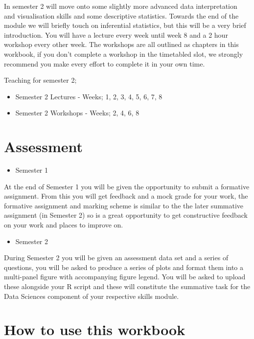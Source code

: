 \documentclass[
]{book}
\providecommand{\tightlist}{%
  \setlength{\itemsep}{0pt}\setlength{\parskip}{0pt}}
\begin{document}
In semester 2 will move onto some slightly more advanced data interpretation and visualisation skills and some descriptive statistics. Towards the end of the module we will briefly touch on inferential statistics, but this will be a very brief introduction. You will have a lecture every week until week 8 and a 2 hour workshop every other week. The workshops are all outlined as chapters in this workbook, if you don't complete a workshop in the timetabled slot, we strongly recommend you make every effort to complete it in your own time.

Teaching for semester 2;

\begin{itemize}
\tightlist
\item
  Semester 2 Lectures - Weeks; 1, 2, 3, 4, 5, 6, 7, 8
\item
  Semester 2 Workshops - Weeks; 2, 4, 6, 8
\end{itemize}

\hypertarget{assessment}{%
\section{Assessment}\label{assessment}}

\begin{itemize}
\tightlist
\item
  Semester 1
\end{itemize}

At the end of Semester 1 you will be given the opportunity to submit a formative assignment. From this you will get feedback and a mock grade for your work, the formative assignment and marking scheme is similar to the the later summative assignment (in Semester 2) so is a great opportunity to get constructive feedback on your work and places to improve on.

\begin{itemize}
\tightlist
\item
  Semester 2
\end{itemize}

During Semester 2 you will be given an assessment data set and a series of questions, you will be asked to produce a series of plots and format them into a multi-panel figure with accompanying figure legend. You will be asked to upload these alongside your R script and these will constitute the summative task for the Data Sciences component of your respective skills module.

\hypertarget{how-to-use-this-workbook}{%
\section{How to use this workbook}\label{how-to-use-this-workbook}}
\end{document}
